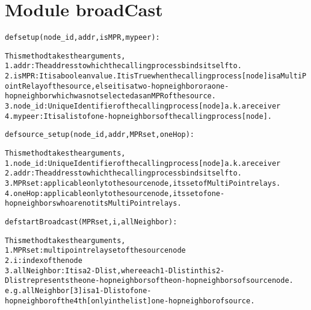 %
%
%


\section{Module broadCast}

    \label{broadCast}
\begin{alltt}


def setup(node\_id, addr, isMPR, mypeer):

    This method takes the arguments, 
    1. addr: The address to which the calling process binds itself to.
    2. isMPR: It is a boolean value. It is True when the calling process [node] is a Multi Point Relay of the source, else it is a two-hop neighbor or a one-hop neighbor which was not selected as an MPR of the source.
    3. node\_id: Unique Identifier of the calling process[node] a.k.a receiver
    4. mypeer: It is a list of one-hop neighbors of the calling process[node].
    
def source\_setup(node\_id, addr, MPRset, oneHop):

    This method takes the arguments,
    1. node\_id: Unique Identifier of the calling process[node] a.k.a receiver
    2. addr: The address to which the calling process binds itself to.
    3. MPRset: applicable only to the source node, its set of Multi Point relays.
    4. oneHop: applicable only to the source node, its set of one-hop neighbors who are not its Multi Point relays.

def startBroadcast(MPRset, i, allNeighbor):

    This method takes the arguments,
    1. MPRset: multi point relay set of the source node
    2. i: index of the node
    3. allNeighbor: It is a 2-D list, where each 1-D list in this 2-D list represents the one-hop neighbors of the on-hop neighbors of source node.
       e.g. allNeighbor[3] is a 1-D list of one-hop neighbor of the 4th[only in the list] one-hop neighbor of source.
    
      
\end{alltt}



